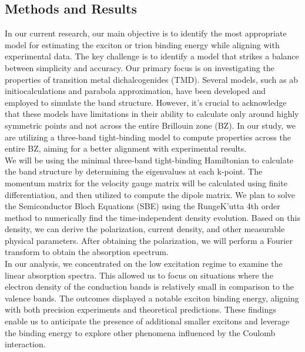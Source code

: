 \documentclass[12pt,english,a4paper]{article}
\begin{document}
	\subsection{Methods and Results}
	\quad In our current research, our main objective is to identify the most appropriate model for estimating the exciton or trion binding energy while aligning with experimental data. The key challenge is to identify a model that strikes a balance between simplicity and accuracy. Our primary focus is on investigating the properties of transition metal dichalcogenides (TMD). Several models, such as ab initiocalculations\cite{kirichenko_influence_2021,ramasubramaniam_large_2012,qiu_optical_2013,cheiwchanchamnangij_quasiparticle_2012,shi_quasiparticle_2013} and parabola approximation\cite{meckbach_ultrafast_2020,berkelbach_theory_2013}, have been developed and employed to simulate the band structure. However, it's crucial to acknowledge that these models have limitations in their ability to calculate only around highly symmetric points and not across the entire Brillouin zone (BZ). In our study, we are utilizing a three-band tight-binding model to compute properties across the entire BZ, aiming for a better alignment with experimental results.\\\null
	\quad We will be using the minimal three-band tight-binding Hamiltonian\cite{liu_three-band_2013} to calculate the band structure by determining the eigenvalues at each k-point. The momentum matrix for the velocity gauge matrix will be calculated using finite differentiation, and then utilized to compute the dipole matrix. We plan to solve the Semiconductor Bloch Equations (SBE) using the RungeK'utta 4th order method to numerically find the time-independent density evolution. Based on this density, we can derive the polarization, current density, and other measurable physical parameters. After obtaining the polarization, we will perform a Fourier transform to obtain the absorption spectrum.\\\null	
	\quad In our analysis, we concentrated on the low excitation regime to examine the linear absorption spectra. This allowed us to focus on situations where the electron density of the conduction bands is relatively small in comparison to the valence bands. The outcomes displayed a notable exciton binding energy, aligning with both precision experiments and theoretical predictions. These findings enable us to anticipate the presence of additional smaller excitons and leverage the binding energy to explore other phenomena influenced by the Coulomb interaction.
	
\end{document}
